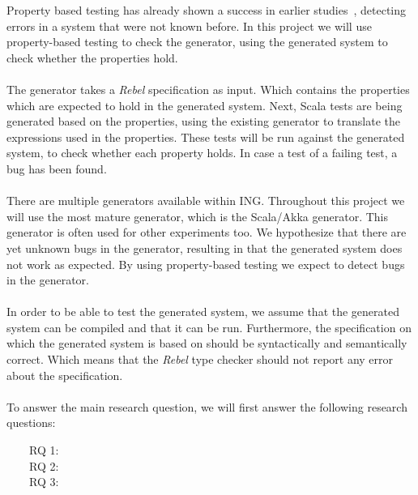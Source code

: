 Property based testing has already shown a success in earlier studies~\cite{fink1997property,claessen2011quickcheck,arts2006testing}, detecting errors in a system that were not known before. In this project we will use property-based testing to check the generator, using the generated system to check whether the properties hold.\\
\\
The generator takes a \textit{Rebel} specification as input. Which contains the properties which are expected to hold in the generated system. Next, Scala tests are being generated based on the properties, using the existing generator to translate the expressions used in the properties. These tests will be run against the generated system, to check whether each property holds. In case a test of a failing test, a bug has been found.\\
\\
There are multiple generators available within ING. Throughout this project we will use the most mature generator, which is the Scala/Akka generator. This generator is often used for other experiments too. We hypothesize that there are yet unknown bugs in the generator, resulting in that the generated system does not work as expected. By using property-based testing we expect to detect bugs in the generator.\\
\\
In order to be able to test the generated system, we assume that the generated system can be compiled and that it can be run. Furthermore, the specification on which the generated system is based on should be syntactically and semantically correct. Which means that the \textit{Rebel} type checker should not report any error about the specification.\\
\\
To answer the main research question, we will first answer the following research questions:
\begin{description}
\item[~~~~RQ 1:] \rqOne
\item[~~~~RQ 2:] \rqTwo
\item[~~~~RQ 3:] \rqThree
\end{description}
